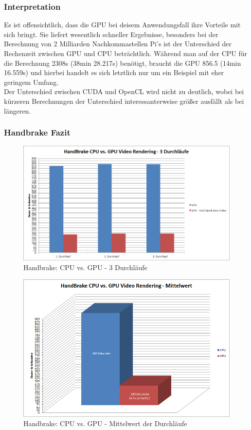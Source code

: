 \subsubsection{Interpretation}
Es ist offensichtlich, dass die GPU bei deisem Anwendungsfall ihre Vorteile mit sich bringt. Sie liefert wesentlich schneller Ergebnisse, besonders bei der Berechnung von 2 Milliarden Nachkommastellen Pi's ist der Unterschied der Rechenzeit zwischen GPU und CPU beträchtlich. Während man auf der CPU für die Berechnung 2308s (38min 28.217s) benötigt, braucht die GPU 856.5 (14min 16.559s) und hierbei handelt es sich letztlich nur um ein Beispiel mit eher geringem Umfang.\\
Der Unterschied zwischen CUDA und OpenCL wird nicht zu deutlich, wobei bei kürzeren Berechnungen der Unterschied interessanterweise größer ausfällt als bei längeren.

\subsubsection{Handbrake Fazit}
\begin{figure}[!h]
	\begin{center}
\includegraphics[width=0.9\linewidth]{images/Handbrake_3runs.png}
		\caption{Handbrake: CPU vs. GPU - 3 Durchläufe}
		\label{Handbrake3runs}
	\end{center}
\end{figure}

\begin{figure}[!h]
	\begin{center}
\includegraphics[width=0.9\linewidth]{images/Handbrake_avg.png}
		\caption{Handbrake: CPU vs. GPU - Mittelwert der Durchläufe}
		\label{HandbrakeAVG}
	\end{center}
\end{figure}

